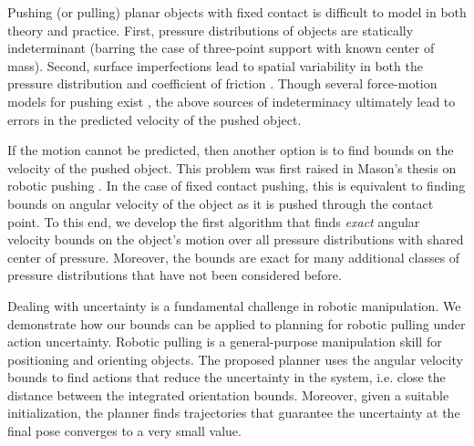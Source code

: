 \documentclass[conference]{IEEEtran}
\begin{document}



Pushing (or pulling) planar objects with fixed contact is difficult to
model in both theory and practice. First, pressure distributions of
objects are statically indeterminant (barring the case of three-point
support with known center of mass). Second, surface imperfections lead
to spatial variability in both the pressure distribution and
coefficient of friction \cite{YuBFR16}. Though several force-motion
models for pushing exist
\cite{zhou2016convex,howe1996practical,goyal1991planar}, the above
sources of indeterminacy ultimately lead to errors in the predicted
velocity of the pushed object.

If the motion cannot be predicted, then another option is to find
bounds on the velocity of the pushed object. This problem was first
raised in Mason's thesis on robotic pushing \cite{Mason1982}. In the
case of fixed contact pushing, this is equivalent to finding bounds on
angular velocity of the object as it is pushed through the contact
point. To this end, we develop the first algorithm that finds
\textit{exact} angular velocity bounds on the object's motion over all
pressure distributions with shared center of pressure. Moreover, the
bounds are exact for many additional classes of pressure distributions
that have not been considered before.

Dealing with uncertainty is a fundamental challenge in robotic
manipulation. We demonstrate how our bounds can be applied to planning
for robotic pulling under action uncertainty. Robotic pulling is a
general-purpose manipulation skill for positioning and orienting
objects. The proposed planner uses the angular velocity bounds to find
actions that reduce the uncertainty in the system, i.e. close the
distance between the integrated orientation bounds. Moreover, given a
suitable initialization, the planner finds trajectories that guarantee
the uncertainty at the final pose converges to a very small value.
\end{document}
